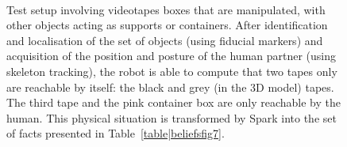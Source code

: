 \documentclass[preprint,3p,times]{elsarticle}
\begin{document}
\begin{figure}[ht!]
   \begin{center}
%
       \\ %
%
   \end{center}

   \caption{Test setup involving videotapes boxes that are manipulated, with other
       objects acting as supports or containers. After identification and
       localisation of the set of objects (using fiducial markers) and
       acquisition of the position and posture of the human partner (using
       skeleton tracking), the robot is able to compute that two tapes only are
       reachable by itself: the black and grey (in the 3D model) tapes.  The
       third tape and the pink container box are only reachable by the human. This
       physical situation is transformed by {\sc Spark} into the set of facts 
       presented in Table~\ref{table|beliefsfig7}.  }%
        
 \label{fig:sparkSubfigures}

\end{figure}
\end{document}
